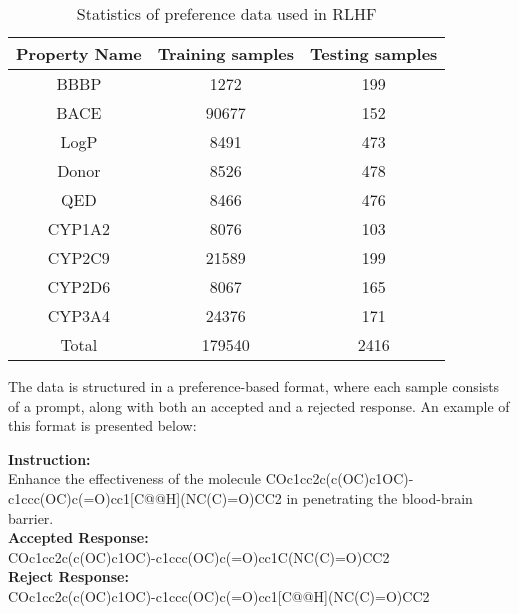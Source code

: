 \begin{table}[b]
\centering
\begin{tabular}{ c|c|c }
\hline
Property Name & Training samples & Testing samples \\ \hline
BBBP          & 1272             & 199             \\  
BACE          & 90677            & 152             \\  
LogP          & 8491             & 473             \\  
Donor         & 8526             & 478             \\  
QED           & 8466             & 476             \\  
CYP1A2        & 8076             & 103             \\  
CYP2C9        & 21589            & 199             \\  
CYP2D6        & 8067             & 165             \\  
CYP3A4        & 24376            & 171             \\ \hline
Total         & 179540           & 2416            \\ \hline
\end{tabular}
\caption{Statistics of preference data used in RLHF}
\label{tab:data-rlhf}
\end{table}

The data is structured in a preference-based format, where each sample consists of a prompt, along with both an accepted and a rejected response. An example of this format is presented below:


 
\begin{example}
\textbf{Instruction: }\\Enhance the effectiveness of the molecule COc1cc2c(c(OC)c1OC)-c1ccc(OC)c(=O)cc1[C@@H](NC(C)=O)CC2  in penetrating the blood-brain barrier.\\
\textbf{Accepted Response: }\\COc1cc2c(c(OC)c1OC)-c1ccc(OC)c(=O)cc1C(NC(C)=O)CC2\\
\textbf{Reject Response: }\\COc1cc2c(c(OC)c1OC)-c1ccc(OC)c(=O)cc1[C@@H](NC(C)=O)CC2
\end{example}  



